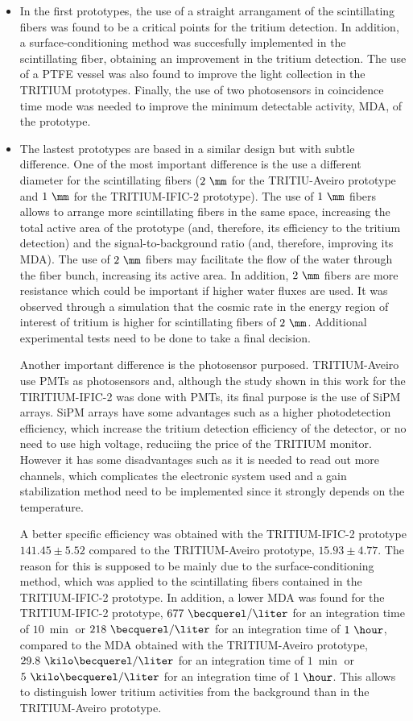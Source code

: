 \begin{itemize}

\item{} In the first prototypes, the use of a straight arrangament of the scintillating fibers was found to be a critical points for the tritium detection. In addition, a surface-conditioning method was succesfully implemented in the scintillating fiber, obtaining an improvement in the tritium detection. The use of a PTFE vessel was also found to improve the light collection in the TRITIUM prototypes. Finally, the use of two photosensors in coincidence time mode was needed to improve the minimum detectable activity, MDA, of the prototype.

\item{} The lastest prototypes are based in a similar design but with subtle difference. One of the most important difference is the use a different diameter for the scintillating fibers ($2~\mm$ for the TRITIU-Aveiro prototype and $1~\mm$ for the TRITIUM-IFIC-2 prototype). The use of $1~\mm$ fibers allows to arrange more scintillating fibers in the same space, increasing the total active area of the prototype (and, therefore, its efficiency to the tritium detection) and the signal-to-background ratio (and, therefore, improving its MDA). The use of $2~\mm$ fibers may facilitate the flow of the water through the fiber bunch, increasing its active area. In addition, $2~\mm$ fibers are more resistance which could be important if higher water fluxes are used. It was observed through a simulation that the cosmic rate in the energy region of interest of tritium is higher for scintillating fibers of $2~\mm$. Additional experimental tests need to be done to take a final decision.

Another important difference is the photosensor purposed. TRITIUM-Aveiro use PMTs as photosensors and, although the study shown in this work for the TIRITIUM-IFIC-2 was done with PMTs, its final purpose is the use of SiPM arrays. SiPM arrays have some advantages such as a higher photodetection efficiency, which increase the tritium detection efficiency of the detector, or no need to use high voltage, reduciing the price of the TRITIUM monitor. However it has some disadvantages such as it is needed to read out more channels, which complicates the electronic system used and a gain stabilization method need to be implemented since it strongly depends on the temperature.

A better specific efficiency was obtained with the TRITIUM-IFIC-2 prototype $141.45 \pm 5.52$ compared to the TRITIUM-Aveiro prototype, $15.93\pm4.77$. The reason for this is supposed to be mainly due to the surface-conditioning method, which was applied to the scintillating fibers contained in the TRITIUM-IFIC-2 prototype. In addition, a lower MDA was found for the TRITIUM-IFIC-2 prototype, $677~\becquerel/\liter$ for an integration time of $10~\min$ or $218~\becquerel/\liter$ for an integration time of $1~\hour$, compared to the MDA obtained with the TRITIUM-Aveiro prototype, $29.8~\kilo\becquerel/\liter$ for an integration time of $1~\min$ or $5~\kilo\becquerel/\liter$ for an integration time of $1~\hour$. This allows to distinguish lower tritium activities from the background than in the TRITIUM-Aveiro prototype.


\end{itemize}
